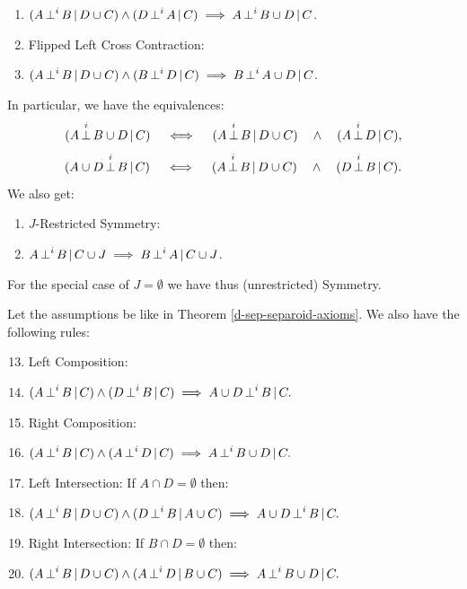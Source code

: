 \begin{defmark}
\begin{claimmark}
\begin{DefThm}
\begin{enumerate}[label=\alph*)]
\item[] $ (A \operatorname*{\perp}^i  B \operatorname*{|} D \cup C) \land (D \operatorname*{\perp}^i  A \operatorname*{|} C) \implies A  \operatorname*{\perp}^i  B \cup D \operatorname*{|} C$.
\item Flipped Left Cross Contraction: 
\item[] $ (A \operatorname*{\perp}^i  B \operatorname*{|} D \cup C) \land (B \operatorname*{\perp}^i  D \operatorname*{|} C) \implies B \operatorname*{\perp}^i  A \cup D \operatorname*{|} C$.
\end{enumerate}
In particular, we have the equivalences:
$$ (A \operatorname*{\perp}^i  B \cup D \operatorname*{|} C) \quad\iff\quad (A \operatorname*{\perp}^i  B \operatorname*{|} D \cup C) \quad\land\quad (A \operatorname*{\perp}^i  D \operatorname*{|} C)  ,$$
$$ (A \cup D \operatorname*{\perp}^i  B \operatorname*{|} C) \quad\iff\quad (A \operatorname*{\perp}^i  B \operatorname*{|} D \cup C) \quad\land\quad (D \operatorname*{\perp}^i  B \operatorname*{|} C).$$
We also get:
\begin{enumerate}[resume,label=\alph*)]
    \item $J$-Restricted Symmetry: 
	\item[] $A \operatorname*{\perp}^i  B \operatorname*{|} C \cup J \implies B \operatorname*{\perp}^i A \operatorname*{|} C \cup J$. 
\end{enumerate}
For the special case of $J=\emptyset$ we have thus (unrestricted) Symmetry.
\end{DefThm}
\end{claimmark}
\end{defmark}


\begin{claimmark}
\begin{Rem}
Let the assumptions be like in Theorem \ref{d-sep-separoid-axioms}.
    We also have the following rules: 
    \begin{enumerate}[resume,label=\alph*)]
        \setcounter{enumi}{12}
        \item Left Composition:
        \item[] $(A \operatorname*{\perp}^i  B \operatorname*{|}  C) \land (D \operatorname*{\perp}^i  B \operatorname*{|} C) \implies A \cup D \operatorname*{\perp}^i  B \operatorname*{|} C.$
        \item Right Composition:
        \item[] $(A \operatorname*{\perp}^i  B \operatorname*{|}  C) \land (A \operatorname*{\perp}^i  D \operatorname*{|} C) \implies A \operatorname*{\perp}^i  B \cup  D \operatorname*{|} C.$
         \item Left Intersection: If $A \cap D = \emptyset$ then:
        \item[] $(A \operatorname*{\perp}^i  B \operatorname*{|} D \cup  C) \land (D \operatorname*{\perp}^i  B \operatorname*{|} A \cup C) \implies A \cup D \operatorname*{\perp}^i  B \operatorname*{|} C.$       
        \item Right Intersection: If $B \cap D = \emptyset$ then:
        \item[] $(A \operatorname*{\perp}^i  B \operatorname*{|} D \cup  C) \land (A \operatorname*{\perp}^i  D \operatorname*{|} B \cup C) \implies A \operatorname*{\perp}^i  B \cup D \operatorname*{|} C.$
    \end{enumerate}
\end{Rem}
\end{claimmark}


